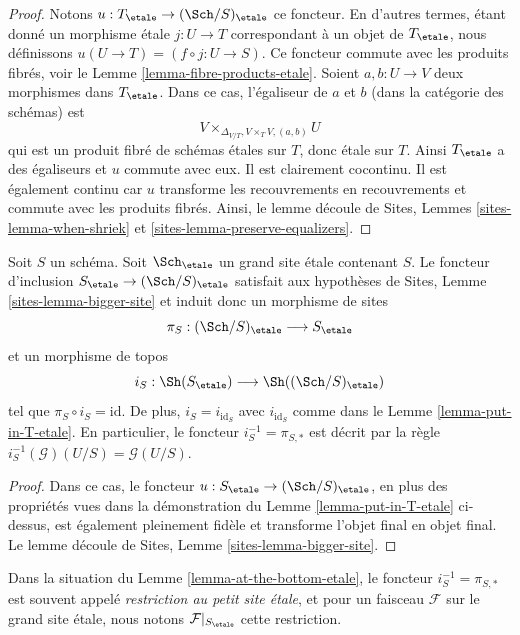 \begin{proof}
Notons $u : T_\etale \to (\Sch/S)_\etale$ ce foncteur. En d'autres termes, étant donné un morphisme étale $j : U \to T$ correspondant à un objet de $T_\etale$, nous définissons $u(U \to T) = (f \circ j : U \to S)$. Ce foncteur commute avec les produits fibrés, voir le Lemme \ref{lemma-fibre-products-etale}. Soient $a, b : U \to V$ deux morphismes dans $T_\etale$. Dans ce cas, l'égaliseur de $a$ et $b$ (dans la catégorie des schémas) est
$$
V \times_{\Delta_{V/T}, V \times_T V, (a, b)} U
$$
qui est un produit fibré de schémas étales sur $T$, donc étale sur $T$. Ainsi $T_\etale$ a des égaliseurs et $u$ commute avec eux. Il est clairement cocontinu. Il est également continu car $u$ transforme les recouvrements en recouvrements et commute avec les produits fibrés. Ainsi, le lemme découle de Sites, Lemmes \ref{sites-lemma-when-shriek} et \ref{sites-lemma-preserve-equalizers}.
\end{proof}

\begin{lemma}
\label{lemma-at-the-bottom-etale}
Soit $S$ un schéma. Soit $\Sch_\etale$ un grand site étale contenant $S$. Le foncteur d'inclusion $S_\etale \to (\Sch/S)_\etale$ satisfait aux hypothèses de Sites, Lemme \ref{sites-lemma-bigger-site} et induit donc un morphisme de sites
$$
\pi_S : (\Sch/S)_\etale \longrightarrow S_\etale
$$
et un morphisme de topos
$$
i_S : \Sh(S_\etale) \longrightarrow \Sh((\Sch/S)_\etale)
$$
tel que $\pi_S \circ i_S = \text{id}$. De plus, $i_S = i_{\text{id}_S}$ avec $i_{\text{id}_S}$ comme dans le Lemme \ref{lemma-put-in-T-etale}. En particulier, le foncteur $i_S^{-1} = \pi_{S, *}$ est décrit par la règle $i_S^{-1}(\mathcal{G})(U/S) = \mathcal{G}(U/S)$.
\end{lemma}

\begin{proof}
Dans ce cas, le foncteur $u : S_\etale \to (\Sch/S)_\etale$, en plus des propriétés vues dans la démonstration du Lemme \ref{lemma-put-in-T-etale} ci-dessus, est également pleinement fidèle et transforme l'objet final en objet final. Le lemme découle de Sites, Lemme \ref{sites-lemma-bigger-site}.
\end{proof}

\begin{definition}
\label{definition-restriction-small-etale}
Dans la situation du Lemme \ref{lemma-at-the-bottom-etale}, le foncteur $i_S^{-1} = \pi_{S, *}$ est souvent appelé {\it restriction au petit site étale}, et pour un faisceau $\mathcal{F}$ sur le grand site étale, nous notons $\mathcal{F}|_{S_\etale}$ cette restriction.
\end{definition}

